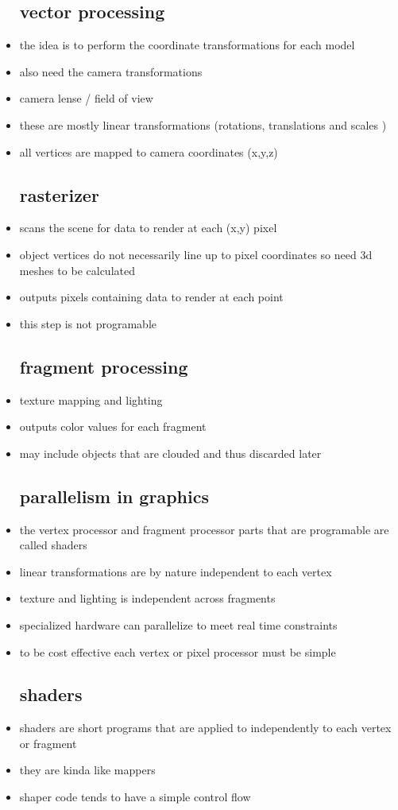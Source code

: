 \documentclass{article}
\begin{document}
\begin{itemize}
\subsection*{vector processing }
\item the idea is to perform the coordinate transformations for each model 
\item also need the camera transformations
\item camera lense / field of view 
\item these are mostly linear transformations (rotations, translations and scales )
\item all vertices are mapped to camera coordinates (x,y,z) 
\subsection*{rasterizer}
\item scans the scene for data to render at each (x,y) pixel 
\item object vertices do not necessarily line up to pixel coordinates so need 3d meshes to be calculated 
\item outputs pixels containing data to render at each point 
\item this step is not programable
\subsection*{fragment processing}
\item  texture mapping and lighting 
\item outputs color values for each fragment
\item may include objects that are clouded and thus discarded later 
\subsection*{parallelism in graphics}
\item the vertex processor and fragment processor parts that are programable are called shaders
\item linear transformations are by nature independent to each vertex 
\item texture and lighting is independent across fragments
\item specialized hardware can parallelize to meet real time constraints 
\item to be cost effective each vertex or pixel processor must be simple
\subsection*{shaders}
\item shaders are short programs that are applied to independently to each vertex or fragment 
\item they are kinda like mappers 
\item shaper code tends to have a simple control flow 

\end{itemize}
\end{document}
